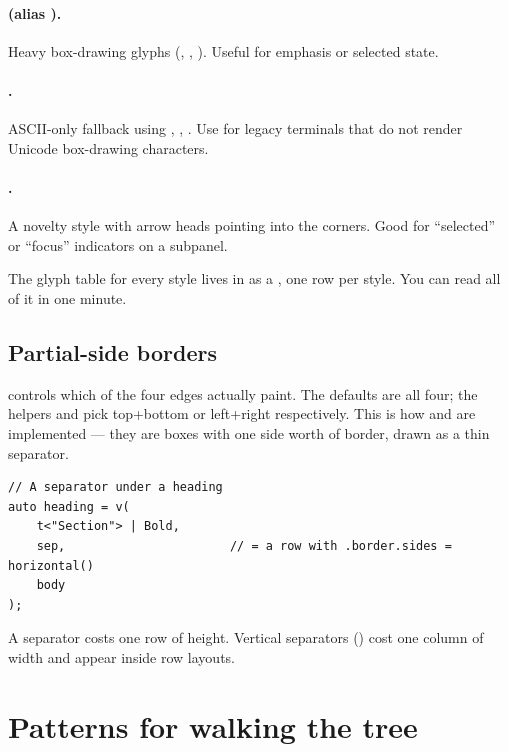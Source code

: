 \paragraph{ (alias ).} Heavy box-drawing
glyphs (, , ). Useful for
emphasis or selected state.

\paragraph{.} ASCII-only fallback using \code{+},
\code{-}, \code{|}. Use for legacy terminals that do not render
Unicode box-drawing characters.

\paragraph{.} A novelty style with arrow heads pointing
into the corners. Good for ``selected'' or ``focus'' indicators on a
subpanel.

The glyph table for every style lives in
 as a 
, one row per style. You can read all of it in one
minute.

\subsection{Partial-side borders}

 controls which of the four edges actually paint.
The defaults are all four; the helpers  and
 pick top+bottom or left+right respectively. This
is how  and  are implemented --- they are
boxes with one side worth of border, drawn as a thin separator.

\begin{lstlisting}
// A separator under a heading
auto heading = v(
    t<"Section"> | Bold,
    sep,                       // = a row with .border.sides = horizontal()
    body
);
\end{lstlisting}

A separator costs one row of height. Vertical separators ()
cost one column of width and appear inside row layouts.

\section{Patterns for walking the tree}
\label{sec:elem:walk-patterns}

